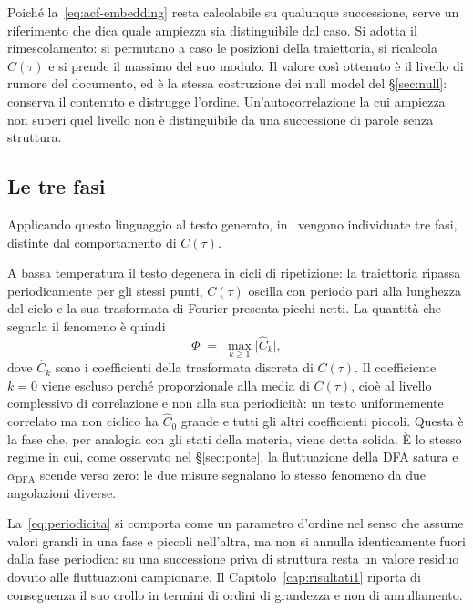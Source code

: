 Poiché la~\eqref{eq:acf-embedding} resta calcolabile su qualunque successione,
serve un riferimento che dica quale ampiezza sia distinguibile dal caso. Si
adotta il rimescolamento: si permutano a caso le posizioni della traiettoria, si
ricalcola $C(\tau)$ e si prende il massimo del suo modulo. Il valore così
ottenuto è il livello di rumore del documento, ed è la stessa costruzione dei
null model del §\ref{sec:null}: conserva il contenuto e distrugge l'ordine.
Un'autocorrelazione la cui ampiezza non superi quel livello non è distinguibile
da una successione di parole senza struttura.


\subsection{Le tre fasi}
\label{sec:tre-fasi}

Applicando questo linguaggio al testo generato,
in~\cite{mikhaylovskiy2025states} vengono individuate tre fasi, distinte dal
comportamento di $C(\tau)$.

A bassa temperatura il testo degenera in cicli di ripetizione: la traiettoria
ripassa periodicamente per gli stessi punti, $C(\tau)$ oscilla con periodo pari
alla lunghezza del ciclo e la sua trasformata di Fourier presenta picchi netti.
La quantità che segnala il fenomeno è quindi
\begin{equation}
  \Phi \;=\; \max_{k \ge 1} \bigl\lvert \hat{C}_k \bigr\rvert ,
  \label{eq:periodicita}
\end{equation}
dove $\hat{C}_k$ sono i coefficienti della trasformata discreta di $C(\tau)$. Il
coefficiente $k = 0$ viene escluso perché proporzionale alla media di $C(\tau)$,
cioè al livello complessivo di correlazione e non alla sua periodicità: un testo
uniformemente correlato ma non ciclico ha $\hat{C}_0$ grande e tutti gli altri
coefficienti piccoli. Questa è la fase che, per analogia con gli stati della
materia, viene detta solida. È lo stesso regime in cui, come osservato nel
§\ref{sec:ponte}, la fluttuazione della DFA satura e $\alpha_{\mathrm{DFA}}$
scende verso zero: le due misure segnalano lo stesso fenomeno da due angolazioni
diverse.

La~\eqref{eq:periodicita} si comporta come un parametro d'ordine nel senso che
assume valori grandi in una fase e piccoli nell'altra, ma non si annulla
identicamente fuori dalla fase periodica: su una successione priva di struttura
resta un valore residuo dovuto alle fluttuazioni campionarie. Il
Capitolo~\ref{cap:risultati1} riporta di conseguenza il suo crollo in termini di
ordini di grandezza e non di annullamento.


